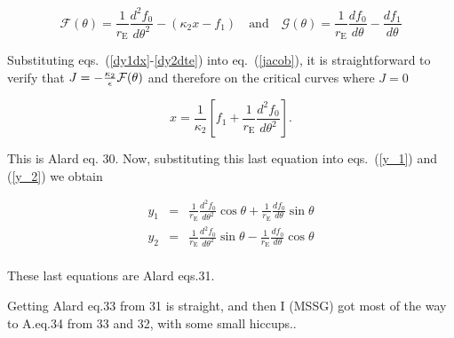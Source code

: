 \documentclass{article}
\newcommand{\eps}{\epsilon}
\def \eps {\epsilon}
\def \te {\theta}
\def \re {r_{\mathrm{E}}}
\def \te {\theta}
\def \kt {\kappa_2}
\def \scriptf {\mathcal{F}}
\def \scriptg {\mathcal{G}}
\begin{document}
\begin{equation}
\scriptf(\te)=\frac{1}{\re}\frac{d^2f_0}{d\te^2}-(\kt x -f_1) \quad \textrm{and} \quad %
\scriptg(\te)=\frac{1}{\re}\frac{df_0}{d\te}-\frac{df_1}{d\te}
\end{equation}

Substituting eqs.~(\ref{dy1dx}-\ref{dy2dte}) into eq.~(\ref{jacob}), it is straightforward to verify that $J=-{\kt \over \eps} \scriptf(\te)$ and therefore on the critical curves where $J = 0$

\begin{equation}
x=\frac{1}{\kt}\left[f_1+\frac{1}{\re}\frac{d^2f_0}{d\te^2}\right] \label{xte}.
\end{equation}

This is Alard eq. 30. Now, substituting this last equation into eqs.~(\ref{y_1})
and (\ref{y_2}) we obtain

\begin{eqnarray*}
y_1 &=& \frac{1}{\re}\frac{d^2f_0}{d\te^2}\cos{\te}+\frac{1}{\re}\frac{df_0}{d\te}\sin{\te}\\
y_2 &=& \frac{1}{\re}\frac{d^2f_0}{d\te^2}\sin{\te}-\frac{1}{\re}\frac{df_0}{d\te}\cos{\te}\\
\end{eqnarray*}

These last equations are Alard eqs.31.



Getting Alard eq.33 from 31 is straight, and then I (MSSG) got most of the way to
A.eq.34 from 33 and 32, with some small hiccups..
\end{document}

